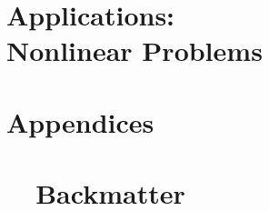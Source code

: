 \documentclass[10pt]{newsiambook}
\begin{document}
%

\part{Applications:\\Nonlinear Problems}




\part{Appendices}
\appendix

%
%
%
%

\part{\ \ Backmatter}
\backmatter
%
%
%
%



\printindex
\end{document}
